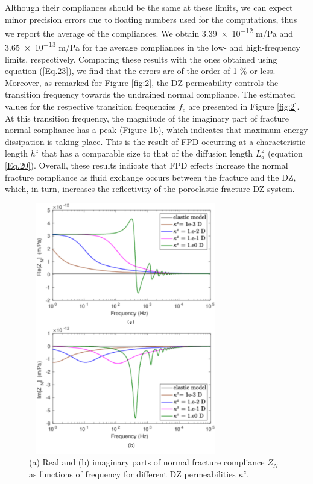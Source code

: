\documentclass[draft]{agujournal2019}
\begin{document}
Although their compliances should be the same at these limits,  we can expect minor precision errors due to floating numbers used for the computations, thus we report the average of the compliances.
We obtain  \num{3.39e-12} m/Pa and \num{3.65e-13} m/Pa for the average compliances in the low- and high-frequency limits, respectively. Comparing these results with the ones obtained using equation (\ref{Eq.23}), we find that the errors are of the order of 1 \% or less.
Moreover, as remarked for Figure \ref{fig:2}, the DZ permeability controls the transition frequency towards the undrained normal compliance. The estimated values  for the respective transition frequencies $f_c$ are presented in Figure \ref{fig:2}. 
At this transition frequency, the magnitude of the imaginary part of fracture normal compliance has a peak (Figure \ref{fig:3}b), which indicates that maximum energy dissipation is taking place. This is the result of FPD occurring at a characteristic length $h^z$ that has a comparable size to that of the diffusion length $L_d^z$ (equation \eqref{Eq.20}).
Overall, these results indicate that FPD effects increase the normal fracture compliance as fluid exchange occurs between the fracture and the DZ, which, in turn, increases the reflectivity of the poroelastic fracture-DZ system. 


\begin{figure}
\centering
        \includegraphics[width=85mm, height=110mm]{Figure3.pdf}
\caption {(a) Real and (b) imaginary parts of  normal fracture compliance $Z_N$ as functions of frequency for different DZ permeabilities $\kappa^z$. } 
\label{fig:3}
\end{figure}
\end{document}
